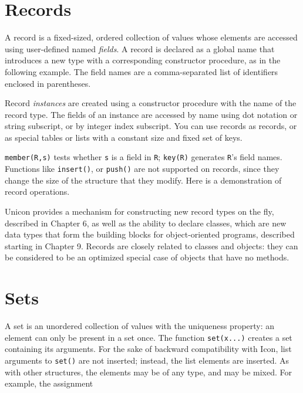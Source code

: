 \section{Records}

A record is a fixed-sized, ordered collection of values
whose elements are accessed using user-defined named \textit{fields}. A
record is declared as a global name that introduces a new type with a
corresponding constructor procedure, as in
the following example. The field names are a comma-separated list of
identifiers enclosed in parentheses.


Record \textit{instances} are created using a
constructor procedure with the name of the record type. The
fields of an instance are accessed by name using dot notation or string
subscript, or by integer index subscript. You can use records as
records, or as special tables or lists with
a constant size and fixed set of keys.

\texttt{member(R,s)} tests whether \texttt{s} is a field in \texttt{R};
\texttt{key(R)} generates \texttt{R}'s field names.
Functions like \texttt{insert()}, or \texttt{push()} are not supported
on records, since they change the size of the structure that they
modify. Here is a demonstration of record operations.


Unicon provides a mechanism for constructing new record types on the
fly, described in Chapter 6, as well as the ability to declare classes,
which are new data types that form the building blocks for
object-oriented programs, described starting in Chapter 9. Records are
closely related to classes and objects: they can be considered to be an
optimized special case of objects that have no methods. \ 

\section{Sets}

A set is an unordered collection of values with the
uniqueness property: an element can only be present in a set once. The
function \texttt{set(x...)} creates a set containing its arguments. For
the sake of backward compatibility with Icon, list arguments to
\texttt{set()} are not inserted; instead, the list elements are
inserted. As with other structures, the elements may be of any type,
and may be mixed. For example, the assignment

